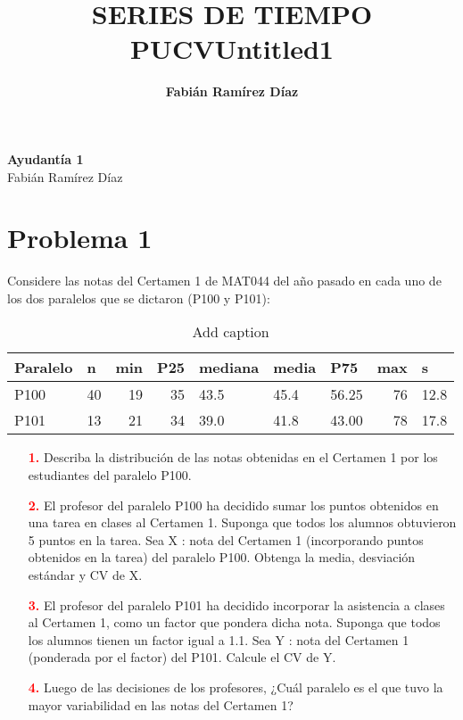 \documentclass[11pt,letterpaper]{report}
\author{\textbf{Fabián Ramírez Díaz}}
\title{\textbf{SERIES DE TIEMPO PUCV}}
\title{Untitled1}
\begin{document}
	\begin{center}
		\huge{
			\textbf{
				Ayudantía 1
			}
		}\\
		\normalsize{
			Fabián Ramírez Díaz
		}
		\end{center}
\section*{Problema 1}
Considere las notas del Certamen 1 de MAT044 del año pasado en cada uno de los dos paralelos
que se dictaron (P100 y P101):
\begin{table}[htbp]
	\centering
	\caption{Add caption}
	\begin{tabular}{|l|r|r|r|l|l|l|r|l|}
		\toprule
		Paralelo & \multicolumn{1}{l|}{ n } & \multicolumn{1}{l|}{min } & \multicolumn{1}{l|}{P25 } & mediana &  media  & P75   & \multicolumn{1}{l|}{max} &  s \\
		\midrule
		P100  & 40    & 19    & 35    & 43.5  & 45.4  & 56.25  & 76    & 12.8 \\
		\midrule
		P101  & 13    & 21    & 34    & 39.0  & 41.8  & 43.00  & 78    & 17.8 \\
		\bottomrule
	\end{tabular}%
	\label{tab:addlabel}%
\end{table}%
\begin{enumerate}
	\item[\textcolor{red}{\bf{1.}}] Describa la distribución de las notas obtenidas en el Certamen 1 por los estudiantes del paralelo
	P100.
	\item[\textcolor{red}{\bf{2.}}]
	El profesor del paralelo P100 ha decidido sumar los puntos obtenidos en una tarea en clases al
	Certamen 1. Suponga que todos los alumnos obtuvieron 5 puntos en la tarea. Sea X : nota del
	Certamen 1 (incorporando puntos obtenidos en la tarea) del paralelo P100. Obtenga la media,
	desviación estándar y CV de X.
	\item[\textcolor{red}{\bf{3.}}] El profesor del paralelo P101 ha decidido incorporar la asistencia a clases al Certamen 1, como
	un factor que pondera dicha nota. Suponga que todos los alumnos tienen un factor igual a 1.1.
	Sea Y : nota del Certamen 1 (ponderada por el factor) del P101. Calcule el CV de Y.
	\item[\textcolor{red}{\bf{4.}}] Luego de las decisiones de los profesores, ¿Cuál paralelo es el que tuvo la mayor variabilidad
	en las notas del Certamen 1?
\end{enumerate}
\newpage
\end{document}
